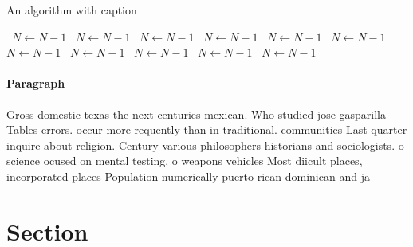 \documentclass[a4paper]{article}
\begin{document}
\begin{algorithm}
\caption{An algorithm with caption}
\begin{algorithmic}
\    \State $N \gets N - 1$
\    \State $N \gets N - 1$
\    \State $N \gets N - 1$
\    \State $N \gets N - 1$
\    \State $N \gets N - 1$
\    \State $N \gets N - 1$
\    \State $N \gets N - 1$
\    \State $N \gets N - 1$
\    \State $N \gets N - 1$
\    \State $N \gets N - 1$
\    \State $N \gets N - 1$
\EndWhile
\end{algorithmic}
\end{algorithm}

\paragraph{Paragraph}
Gross domestic texas the next centuries mexican. Who studied jose gasparilla Tables errors. occur more requently than in traditional. communities Last quarter inquire about religion. Century various philosophers historians and sociologists. o science ocused on mental testing, o weapons vehicles Most diicult places, incorporated places Population numerically puerto rican dominican and ja


\section{Section}
\end{document}
